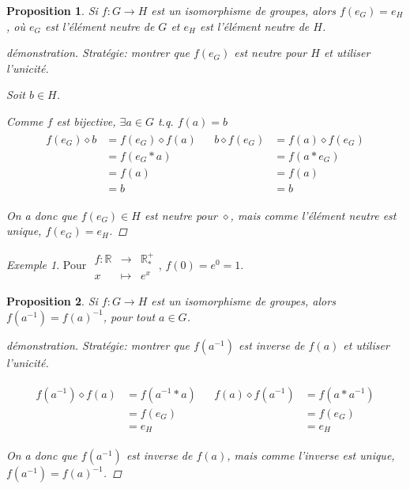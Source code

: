 \documentclass{report}
\newtheorem*{prop}{Proposition}
\theoremstyle{definition}
\theoremstyle{remark}
\newtheorem*{exem}{Exemple}
\begin{document}
	\begin{prop}
		Si $f:G \to H$ est un isomorphisme de groupes, alors $f(e_G)=e_H$, o\`u $e_G$ est l'\'el\'ement neutre de $G$ et $e_H$ est l'\'el\'ement neutre de $H$.
		\begin{proof}[d\'emonstration]
			Strat\'egie: montrer que $f(e_G)$ est neutre pour $H$ et utiliser l'unicit\'e.

			Soit $b \in H$.

			Comme $f$ est bijective, $\exists a \in G$ t.q. $f(a)=b$
			\begin{align*}
				\begin{split}
					f(e_G) \diamond b&= f(e_G) \diamond f(a)\\
					&= f(e_G*a)\\
					&= f(a)\\
					&=b
				\end{split}
				&
				\begin{split}
					b \diamond f(e_G)&= f(a) \diamond f(e_G)\\
					&= f(a*e_G)\\
					&= f(a)\\
					&= b
				\end{split}
			\end{align*}

			On a donc que $f(e_G) \in H$ est neutre pour $\diamond$, mais comme l'\'el\'ement neutre est unique, $f(e_G)=e_H$.
		\end{proof}
	\end{prop}
	\begin{exem}
		Pour $\begin{array}{rcl}
			f:\mathbb{R}&\to&\mathbb{R}^+_*\\
			x&\mapsto&e^x
		\end{array}$, $f(0)=e^0=1$.
	\end{exem}
	\begin{prop}
		Si $f:G \to H$ est un isomorphisme de groupes, alors $f(a^{-1})=f(a)^{-1}$, pour tout $a \in G$.
		\begin{proof}[d\'emonstration]
			Strat\'egie: montrer que $f(a^{-1})$ est inverse de $f(a)$ et utiliser l'unicit\'e.

			\begin{align*}
				\begin{split}
					f(a^{-1}) \diamond f(a)&= f(a^{-1}*a)\\
					&= f(e_G)\\
					&= e_H
				\end{split}
				&
				\begin{split}
					f(a) \diamond f(a^{-1})&= f(a*a^{-1})\\
					&= f(e_G)\\
					&= e_H
				\end{split}
			\end{align*}

			On a donc que $f(a^{-1})$ est inverse de $f(a)$, mais comme l'inverse est unique, $f(a^{-1})=f(a)^{-1}$.
		\end{proof}
	\end{prop}
\end{document}
